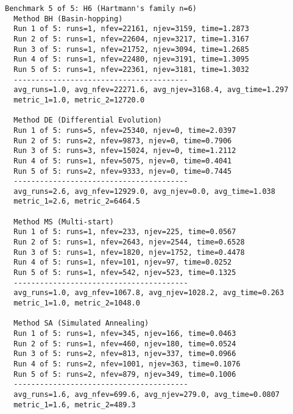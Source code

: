 \footnotesize
\begin{verbatim}
Benchmark 5 of 5: H6 (Hartmann's family n=6)
  Method BH (Basin-hopping)
  Run 1 of 5: runs=1, nfev=22161, njev=3159, time=1.2873
  Run 2 of 5: runs=1, nfev=22604, njev=3217, time=1.3167
  Run 3 of 5: runs=1, nfev=21752, njev=3094, time=1.2685
  Run 4 of 5: runs=1, nfev=22480, njev=3191, time=1.3095
  Run 5 of 5: runs=1, nfev=22361, njev=3181, time=1.3032
  ----------------------------------------
  avg_runs=1.0, avg_nfev=22271.6, avg_njev=3168.4, avg_time=1.297
  metric_1=1.0, metric_2=12720.0

  Method DE (Differential Evolution)
  Run 1 of 5: runs=5, nfev=25340, njev=0, time=2.0397
  Run 2 of 5: runs=2, nfev=9873, njev=0, time=0.7906
  Run 3 of 5: runs=3, nfev=15024, njev=0, time=1.2112
  Run 4 of 5: runs=1, nfev=5075, njev=0, time=0.4041
  Run 5 of 5: runs=2, nfev=9333, njev=0, time=0.7445
  ----------------------------------------
  avg_runs=2.6, avg_nfev=12929.0, avg_njev=0.0, avg_time=1.038
  metric_1=2.6, metric_2=6464.5

  Method MS (Multi-start)
  Run 1 of 5: runs=1, nfev=233, njev=225, time=0.0567
  Run 2 of 5: runs=1, nfev=2643, njev=2544, time=0.6528
  Run 3 of 5: runs=1, nfev=1820, njev=1752, time=0.4478
  Run 4 of 5: runs=1, nfev=101, njev=97, time=0.0252
  Run 5 of 5: runs=1, nfev=542, njev=523, time=0.1325
  ----------------------------------------
  avg_runs=1.0, avg_nfev=1067.8, avg_njev=1028.2, avg_time=0.263
  metric_1=1.0, metric_2=1048.0

  Method SA (Simulated Annealing)
  Run 1 of 5: runs=1, nfev=345, njev=166, time=0.0463
  Run 2 of 5: runs=1, nfev=460, njev=180, time=0.0524
  Run 3 of 5: runs=2, nfev=813, njev=337, time=0.0966
  Run 4 of 5: runs=2, nfev=1001, njev=363, time=0.1076
  Run 5 of 5: runs=2, nfev=879, njev=349, time=0.1006
  ----------------------------------------
  avg_runs=1.6, avg_nfev=699.6, avg_njev=279.0, avg_time=0.0807
  metric_1=1.6, metric_2=489.3
\end{verbatim}

